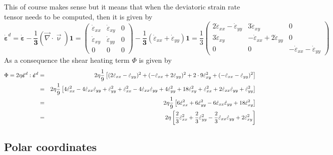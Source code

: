 This of course makes sense but it means that when the deviatoric strain rate tensor needs to be 
computed, then it is given by
\[
\dot{\bm \varepsilon}^d = \dot{\bm \varepsilon} 
- \frac{1}{\bm 3} (\vec\nabla\cdot\vec\upnu) {\bm 1}
=
\left(
\begin{array}{ccc}
\dot{\varepsilon}_{xx} & \dot{\varepsilon}_{xy} &  0 \\
\dot{\varepsilon}_{xy} & \dot{\varepsilon}_{yy} &  0 \\
0 &0 & 0
\end{array}
\right)
- \frac{1}{\bm 3} (\dot{\varepsilon}_{xx}+\dot{\varepsilon}_{yy}) {\bm 1}
=
\frac{1}{3}
\left(
\begin{array}{ccc}
2 \dot{\varepsilon}_{xx} - \dot{\varepsilon}_{yy} & 3\dot{\varepsilon}_{xy} &  0 \\
3\dot{\varepsilon}_{xy} & -\dot{\varepsilon}_{xx}+2 \dot{\varepsilon}_{yy} &  0 \\
0 &0 & -\dot{\varepsilon}_{xx}-\dot{\varepsilon}_{yy}
\end{array}
\right)
\]
As a consequence the shear heating term $\Phi$ is given by 
\begin{eqnarray}
\Phi = 2 \eta \dot{\bm \varepsilon}^d :\dot{\bm \varepsilon}^d 
&=& 2 \eta \frac19
\left[
(2\dot{\varepsilon}_{xx}-\dot{\varepsilon}_{yy})^2 +
(-\dot{\varepsilon}_{xx}+2\dot{\varepsilon}_{yy})^2 +
2\cdot 9\dot{\varepsilon}_{xy}^2
+( -\dot{\varepsilon}_{xx}-\dot{\varepsilon}_{yy})^2 \right] \nonumber\\
&=& 2\eta \frac19
\left[
4\dot{\varepsilon}_{xx}^2 - 4 \dot{\varepsilon}_{xx}\dot{\varepsilon}_{yy}
+\dot{\varepsilon}_{yy}^2
+ \dot{\varepsilon}_{xx}^2 - 4 \dot{\varepsilon}_{xx}\dot{\varepsilon}_{yy}
+ 4\dot{\varepsilon}_{yy}^2
+ 18 \dot{\varepsilon}_{xy}^2
+ \dot{\varepsilon}_{xx}^2 +2\dot{\varepsilon}_{xx}\dot{\varepsilon}_{yy}
+ \dot{\varepsilon}_{yy}^2 \right] \nonumber\\
&=& 2\eta \frac19
\left[ 6 \dot{\varepsilon}_{xx}^2 
+ 6 \dot{\varepsilon}_{yy}^2 
-6 \dot{\varepsilon}_{xx}\dot{\varepsilon}_{yy}
+ 18 \dot{\varepsilon}_{xy}^2 \right] \nonumber\\
&=& 2\eta \left[ \frac{2}{3} \dot{\varepsilon}_{xx}^2 
+ \frac23 \dot{\varepsilon}_{yy}^2 
-\frac23 \dot{\varepsilon}_{xx}\dot{\varepsilon}_{yy}
+ 2 \dot{\varepsilon}_{xy}^2 \right]
\end{eqnarray}


\subsection{Polar coordinates \label{ss:srpc}}

